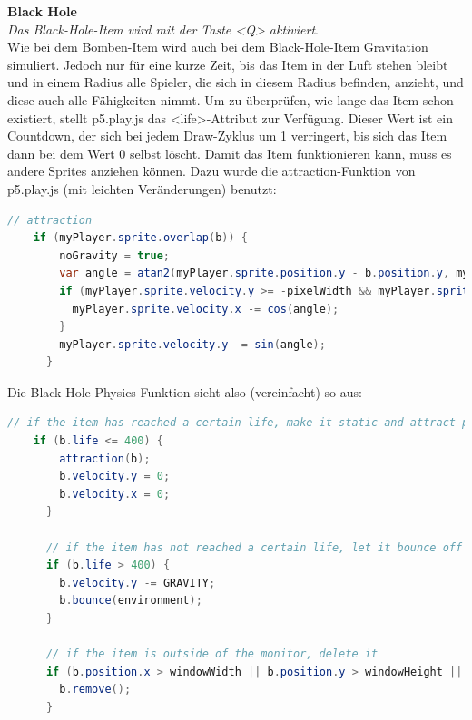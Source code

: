 \textbf{Black Hole}
\\
\textit{Das Black-Hole-Item wird mit der Taste <Q> aktiviert}.
\\
Wie bei dem Bomben-Item wird auch bei dem Black-Hole-Item Gravitation simuliert. Jedoch nur für eine kurze Zeit, bis das Item in der Luft stehen bleibt und in einem Radius alle Spieler, die sich in diesem Radius befinden, anzieht, und diese auch alle Fähigkeiten nimmt.
Um zu überprüfen, wie lange das Item schon existiert, stellt p5.play.js das <life>-Attribut zur Verfügung. Dieser Wert ist ein Countdown, der sich bei jedem Draw-Zyklus um 1 verringert, bis sich das Item dann bei dem Wert 0 selbst löscht.
Damit das Item funktionieren kann, muss es andere Sprites anziehen können. Dazu wurde die attraction-Funktion von p5.play.js (mit leichten Veränderungen) benutzt:

\begin{lstlisting}[caption=Attraction,language=Java,label=lst:impl:attraction]
    // attraction
    if (myPlayer.sprite.overlap(b)) {
        noGravity = true;
        var angle = atan2(myPlayer.sprite.position.y - b.position.y, myPlayer.sprite.position.x - b.position.x);
        if (myPlayer.sprite.velocity.y >= -pixelWidth && myPlayer.sprite.velocity.y <= pixelWidth) {
          myPlayer.sprite.velocity.x -= cos(angle);
        }
        myPlayer.sprite.velocity.y -= sin(angle);
      }

\end{lstlisting}

Die Black-Hole-Physics Funktion sieht also (vereinfacht) so aus:
\\
\begin{lstlisting}[caption=Black Hole Item Physics,language=Java,label=lst:impl:bombGravity]
    // if the item has reached a certain life, make it static and attract players
    if (b.life <= 400) {
        attraction(b);
        b.velocity.y = 0;
        b.velocity.x = 0;
      }

      // if the item has not reached a certain life, let it bounce off the environment
      if (b.life > 400) {
        b.velocity.y -= GRAVITY;
        b.bounce(environment);
      }

      // if the item is outside of the monitor, delete it
      if (b.position.x > windowWidth || b.position.y > windowHeight || b.life == 0) {
        b.remove();
      }

\end{lstlisting}

